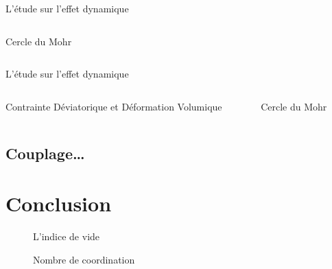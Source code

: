 \documentclass[a4paper,12pt]{report}
\begin{document}
\begin{table}
\begin{frame}{L'étude sur l'effet dynamique}
\begin{columns}
        \begin{column}{0.5\textwidth}
            \centering
            \scalebox{0.5}{}
            \vspace{0.5em}
            {\small Cercle du Mohr}
        \end{column}
        \end{columns}
        \end{frame}


                                \begin{frame}{L'étude sur l'effet dynamique}
    \begin{columns}
        \begin{column}{0.5\textwidth}
            \centering
            \scalebox{0.5}{}
            \vspace{0.5em}
            {\small Contrainte Déviatorique et Déformation Volumique}
        \end{column}
            
        \begin{column}{0.5\textwidth}
            \centering
            \scalebox{0.5}{}
            \vspace{0.5em}
            {\small Cercle du Mohr}
        \end{column}
        \end{columns}

    \end{frame}

\section{Couplage\ldots}

\chapter{Conclusion}

                                \begin{figure}
                                    \centering
                                  \small
                                  
                                    \caption{L'indice de vide}
                                \end{figure}
                                    
                                \begin{figure}
                                   
                                    \caption{Nombre de coordination}
                                \end{figure}


\end{table}
\end{document}
